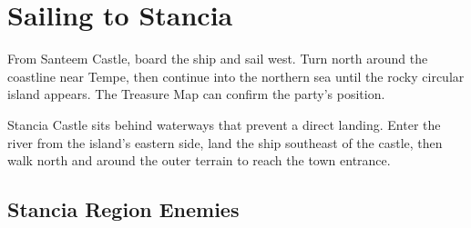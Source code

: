 \documentclass[
  american,
  10pt,
  letterpaper,
  oneside,
  open=any]{scrreprt}
\begin{document}
\section{Sailing to Stancia}\label{sailing-to-stancia}

From Santeem Castle, board the ship and sail west. Turn north around the
coastline near Tempe, then continue into the northern sea until the
rocky circular island appears. The Treasure Map can confirm the party's
position.

Stancia Castle sits behind waterways that prevent a direct landing.
Enter the river from the island's eastern side, land the ship southeast
of the castle, then walk north and around the outer terrain to reach the
town entrance.

\subsection{Stancia Region Enemies}\label{stancia-region-enemies}
\end{document}
